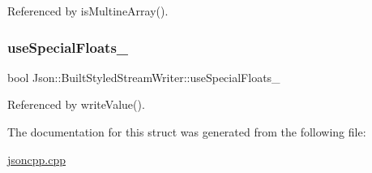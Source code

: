 Referenced by is\+Multine\+Array().

\mbox{\label{structJson_1_1BuiltStyledStreamWriter_a6f1b8694b4eb17ab8c34f6d6dd8c8a4a_a6f1b8694b4eb17ab8c34f6d6dd8c8a4a}} 
\subsubsection{\texorpdfstring{use\+Special\+Floats\+\_\+}{useSpecialFloats\_}}
{\footnotesize\ttfamily bool Json\+::\+Built\+Styled\+Stream\+Writer\+::use\+Special\+Floats\+\_\+\hspace{0.3cm}{\ttfamily [private]}}



Referenced by write\+Value().



The documentation for this struct was generated from the following file\+:\begin{DoxyCompactItemize}
\item 
\hyperlink{jsoncpp_8cpp}{jsoncpp.\+cpp}\end{DoxyCompactItemize}
